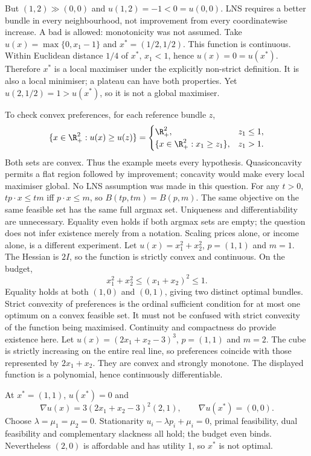 \documentclass[11pt,a4paper]{article}
\begin{document}
But $(1,2)\gg(0,0)$ and $u(1,2)=-1<0=u(0,0)$. LNS requires a better bundle in every neighbourhood, not improvement from every coordinatewise increase. A bad is allowed: monotonicity was not assumed.
Take $u(x)=\max\{0,x_1-1\}$ and $x^*=(1/2,1/2)$. This function is continuous. Within Euclidean distance $1/4$ of $x^*$, $x_1<1$, hence $u(x)=0=u(x^*)$. Therefore $x^*$ is a local maximiser under the explicitly non-strict definition. It is also a local minimiser; a plateau can have both properties. Yet $u(2,1/2)=1>u(x^*)$, so it is not a global maximiser.

To check convex preferences, for each reference bundle $z$,
\[
 \{x\in\R_+^2:u(x)\ge u(z)\}=
 \begin{cases}
 \R_+^2,&z_1\le1,\\
 \{x\in\R_+^2:x_1\ge z_1\},&z_1>1.
 \end{cases}
\]
Both sets are convex. Thus the example meets every hypothesis. Quasiconcavity permits a flat region followed by improvement; concavity would make every local maximiser global. No LNS assumption was made in this question.
For any $t>0$, $tp\cdot x\le tm$ iff $p\cdot x\le m$, so $B(tp,tm)=B(p,m)$. The same objective on the same feasible set has the same full argmax set. Uniqueness and differentiability are unnecessary. Equality even holds if both argmax sets are empty; the question does not infer existence merely from a notation. Scaling prices alone, or income alone, is a different experiment.
Let $u(x)=x_1^2+x_2^2$, $p=(1,1)$ and $m=1$. The Hessian is $2I$, so the function is strictly convex and continuous. On the budget,
\[
 x_1^2+x_2^2\le(x_1+x_2)^2\le1.
\]
Equality holds at both $(1,0)$ and $(0,1)$, giving two distinct optimal bundles. Strict convexity of preferences is the ordinal sufficient condition for at most one optimum on a convex feasible set. It must not be confused with strict convexity of the function being maximised. Continuity and compactness do provide existence here.
\clearpage
{}
Let $u(x)=(2x_1+x_2-3)^3$, $p=(1,1)$ and $m=2$. The cube is strictly increasing on the entire real line, so preferences coincide with those represented by $2x_1+x_2$. They are convex and strongly monotone. The displayed function is a polynomial, hence continuously differentiable.

At $x^*=(1,1)$, $u(x^*)=0$ and
\[
 \nabla u(x)=3(2x_1+x_2-3)^2(2,1),\qquad \nabla u(x^*)=(0,0).
\]
Choose $\lambda=\mu_1=\mu_2=0$. Stationarity $u_i-\lambda p_i+\mu_i=0$, primal feasibility, dual feasibility and complementary slackness all hold; the budget even binds. Nevertheless $(2,0)$ is affordable and has utility 1, so $x^*$ is not optimal.
\end{document}
